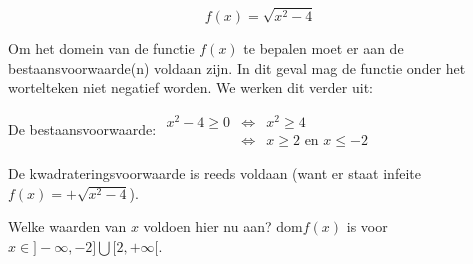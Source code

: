\begin{voorbeeld}
	\begin{equation*}
f(x)=\sqrt{x^{2}-4}
\end{equation*}

\begin{figure}[H]
		
\end{figure}



Om het domein van de functie $f(x)$ te bepalen moet er aan de bestaansvoorwaarde(n)
voldaan zijn. In dit geval mag de functie onder het wortelteken niet
negatief worden. We werken dit verder uit:

De bestaansvoorwaarde: $\begin{array}{cccl}
x^{2}-4\geq0 &\iff & x^{2}\geq4\\
& \iff & x\geq2 \textrm{ en } x\leq-2
\end{array}$

De kwadrateringsvoorwaarde is reeds voldaan (want er staat infeite
$f(x)=+\sqrt{x^{2}-4}$).

Welke waarden van $x$ voldoen hier nu aan? $\textrm{dom}f(x)$ is voor $x\in]-\infty,-2]\bigcup[2,+\infty[$.

\end{voorbeeld}


